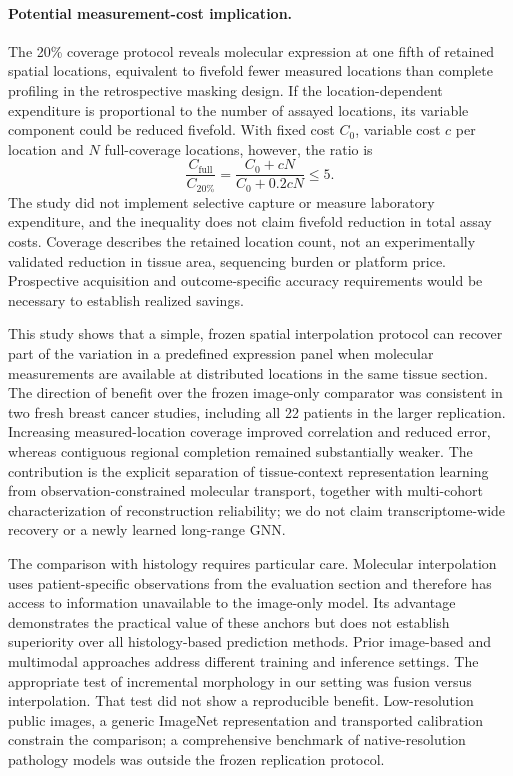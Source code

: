 \paragraph{Potential measurement-cost implication.}
The 20\% coverage protocol reveals molecular expression at one fifth of retained spatial locations, equivalent to fivefold fewer measured locations than complete profiling in the retrospective masking design. If the location-dependent expenditure is proportional to the number of assayed locations, its variable component could be reduced fivefold. With fixed cost $C_0$, variable cost $c$ per location and $N$ full-coverage locations, however, the ratio is
\begin{equation}
\frac{C_{\mathrm{full}}}{C_{20\%}}=\frac{C_0+cN}{C_0+0.2cN}\leq 5.
\label{eq:cost_ratio}
\end{equation}
The study did not implement selective capture or measure laboratory expenditure, and the inequality does not claim fivefold reduction in total assay costs. Coverage describes the retained location count, not an experimentally validated reduction in tissue area, sequencing burden or platform price. Prospective acquisition and outcome-specific accuracy requirements would be necessary to establish realized savings.


This study shows that a simple, frozen spatial interpolation protocol can recover part of the variation in a predefined expression panel when molecular measurements are available at distributed locations in the same tissue section. The direction of benefit over the frozen image-only comparator was consistent in two fresh breast cancer studies, including all 22 patients in the larger replication. Increasing measured-location coverage improved correlation and reduced error, whereas contiguous regional completion remained substantially weaker. The contribution is the explicit separation of tissue-context representation learning from observation-constrained molecular transport, together with multi-cohort characterization of reconstruction reliability; we do not claim transcriptome-wide recovery or a newly learned long-range GNN.

The comparison with histology requires particular care. Molecular interpolation uses patient-specific observations from the evaluation section and therefore has access to information unavailable to the image-only model. Its advantage demonstrates the practical value of these anchors but does not establish superiority over all histology-based prediction methods. Prior image-based and multimodal approaches address different training and inference settings\cite{he2020,monjo2022,bergenstrahle2022,liu2026}. The appropriate test of incremental morphology in our setting was fusion versus interpolation. That test did not show a reproducible benefit. Low-resolution public images, a generic ImageNet representation and transported calibration constrain the comparison; a comprehensive benchmark of native-resolution pathology models was outside the frozen replication protocol.

